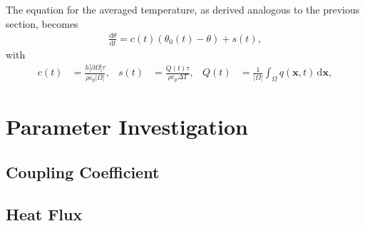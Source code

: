 \documentclass{beamer}
\newcommand{\deriv}[2]{\frac{\mathrm{d} #1}{\mathrm{d} #2}}
\begin{document}
\begin{frame}
 The equation for the averaged 
temperature, as derived analogous to the previous section, becomes
\begin{align}
\label{eq:aveode}
    \deriv{\theta}{t} = 
    c(t)(\theta_0(t) - \theta) + s(t),
\end{align}
with
\begin{align}
\label{params}
    c(t) &= \frac{h|\partial \Omega|\tau}{\rho c_p|\Omega|},&
    s(t) &= \frac{Q(t)\tau}{\rho c_p\Delta T},&
    Q(t) &= \frac{1}{|\Omega|}\int_{\Omega}
    q(\mathbf{x},t)\,\mathrm{d} \mathbf{x},
\end{align}
\end{frame}

\section{Parameter Investigation}
\subsection{Coupling Coefficient}

\subsection{Heat Flux}
\end{document}

